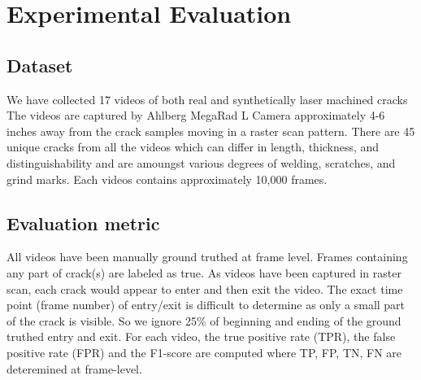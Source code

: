 \section{Experimental Evaluation}

    \subsection{Dataset} \label{dataset}
        We have collected 17 videos of both real and synthetically laser machined cracks  The videos are captured by Ahlberg MegaRad L Camera approximately 4-6 inches away from the crack samples moving in a raster scan pattern.  There are 45 unique cracks from all the videos which can differ in length, thickness, and distinguishability and are amoungst various degrees of welding, scratches, and grind marks. Each videos contains approximately 10,000 frames.

    \subsection{Evaluation metric}
        All videos have been manually ground truthed at frame level. Frames containing any part of crack(s) are labeled as true.  As videos have been captured in raster scan, each crack would appear to enter and then exit the video.  The exact time point (frame number) of entry/exit is difficult to determine as only a small part of the crack is visible.  So we ignore  25\% of beginning and ending of the ground truthed entry and exit.
        For each video, the true positive rate (TPR), the false positive rate (FPR) and the F1-score are computed where TP, FP, TN, FN are deteremined at frame-level.
        
        
